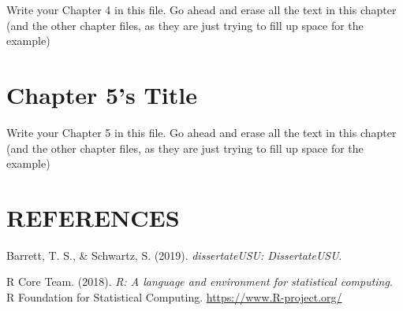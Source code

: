 \documentclass{DissertateUSU}
\newenvironment{CSLReferences}%
  {}%
  {\par}
\begin{document}
\doublespacing

Write your Chapter 4 in this file. Go ahead and erase all the text in
this chapter (and the other chapter files, as they are just trying to
fill up space for the example)

\lipsum

\FloatBarrier
\newpage
\fancyhead[R]{\thepage}
\fancyfoot[C]{}

\chapter{Chapter 5's Title}

\doublespacing

Write your Chapter 5 in this file. Go ahead and erase all the text in
this chapter (and the other chapter files, as they are just trying to
fill up space for the example)

\lipsum

\FloatBarrier
\newpage
\fancyhead[R]{\thepage}
\fancyfoot[C]{}

\chapter*{REFERENCES}

\setlength{\parindent}{-0.5in}
\setlength{\leftskip}{0.4in}
\setlength{\parskip}{6pt}

\noindent

\hypertarget{refs}{}
\begin{CSLReferences}{1}{0}
\leavevmode{}%
Barrett, T. S., \& Schwartz, S. (2019). \emph{dissertateUSU:
DissertateUSU}.

\leavevmode{}%
R Core Team. (2018). \emph{R: A language and environment for statistical
computing}. R Foundation for Statistical Computing.
\url{https://www.R-project.org/}

\end{CSLReferences}

\end{document}
